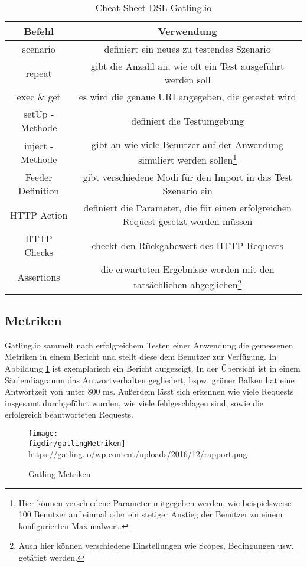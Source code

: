 \begin{table}[]
\centering
\caption{Cheat-Sheet DSL Gatling.io}
\label{table_cheatSheetDSL}
\begin{adjustbox}{max width=\textwidth}
\begin{tabular}{|c|c|}
\hline
\rowcolor[HTML]{FFCB2F} 
\textbf{Befehl} & \textbf{Verwendung} \\ \hline
scenario &  definiert ein neues zu testendes Szenario\\ \hline
repeat & gibt die Anzahl an, wie oft ein Test ausgeführt werden soll \\ \hline
exec \& get & es wird die genaue \ac{URI} angegeben, die getestet wird  \\ \hline
setUp - Methode & definiert die Testumgebung \\ \hline
inject - Methode & gibt an wie viele Benutzer auf der Anwendung simuliert werden sollen\footnote{{} Hier können verschiedene Parameter mitgegeben werden, wie beispielsweise 100 Benutzer auf einmal oder ein stetiger Anstieg der Benutzer zu einem konfigurierten Maximalwert.}  \\ \hline
Feeder Definition & gibt verschiedene Modi für den Import in das Test Szenario ein \\ \hline
HTTP Action & definiert die Parameter, die für einen erfolgreichen Request gesetzt werden müssen \\ \hline
HTTP Checks & checkt den Rückgabewert des HTTP Requests  \\ \hline
Assertions &  die erwarteten Ergebnisse werden mit den tatsächlichen abgeglichen\footnote{{} Auch hier können verschiedene Einstellungen wie Scopes, Bedingungen usw. getätigt werden. } \\ \hline


\end{tabular}
\end{adjustbox}
\end{table}

\subsection{Metriken}

Gatling.io sammelt nach erfolgreichem Testen einer Anwendung die gemessenen Metriken in einem Bericht und stellt diese dem Benutzer zur Verfügung. In Abbildung \ref{fig:gatlingMetriken} ist exemplarisch ein Bericht aufgezeigt. In der Übersicht ist in einem Säulendiagramm das Antwortverhalten gegliedert, bspw. grüner Balken hat eine Antwortzeit von unter 800 ms. Außerdem lässt sich erkennen wie viele Requests insgesamt durchgeführt wurden, wie viele fehlgeschlagen sind, sowie die erfolgreich beantworteten Requests.
\begin{figure}
	{\caption{Gatling Metriken}
		\label{fig:gatlingMetriken}}
	{\texttt{[image: \\figdir/gatlingMetriken]}}\\
	\tiny{\quelle\url{https://gatling.io/wp-content/uploads/2016/12/rapport.png}}
\end{figure}



